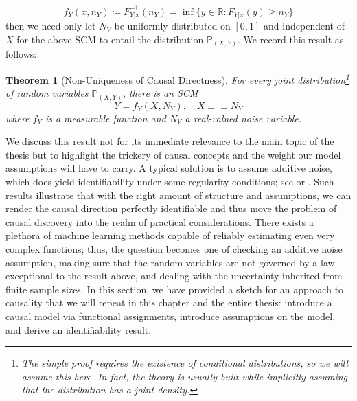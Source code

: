 \documentclass[11pt, a4paper]{memoir}
\theoremstyle{break}
\newtheorem{thm}{Theorem}
\theoremstyle{break}
\theoremstyle{nonumberplain}
\newcommand{\mR}{\mathbb{R}}
\newcommand{\mP}{\mathbb{P}}
\newcommand{\indep}{\perp \!\!\! \perp}
\begin{document}
$$f_Y(x,n_Y)\coloneqq F^{-1}_{Y|x}(n_Y)=\inf\{y\in \mR: F_{Y|x}(y)\geqslant n_Y\}$$
then we need only let $N_Y$ be uniformly distributed on $[0,1]$ and independent of $X$ for the above SCM to entail the distribution $\mP_{(X,Y)}$. We record this result as follows:
\begin{thm}[Non-Uniqueness of Causal Directness]
For every joint distribution\footnote{The simple proof requires the existence of conditional distributions, so we will assume this here. In fact, the theory is usually built while implicitly assuming that the distribution has a joint density.} of random variables $\mP_{(X,Y)}$, there is an SCM
$$Y=f_Y(X,N_Y),\quad X\indep N_Y$$
where $f_Y$ is a measurable function and $N_Y$ a real-valued noise variable.\\ \cite{Peters}
\end{thm}
We discuss this result not for its immediate relevance to the main topic of the thesis but to highlight the trickery of causal concepts and the weight our model assumptions will have to carry. A typical solution is to assume additive noise, which does yield identifiability under some regularity conditions; see \cite{ANM1} or \cite{ANM2}. Such results illustrate that with the right amount of structure and assumptions, we can render the causal direction perfectly identifiable and thus move the problem of causal discovery into the realm of practical considerations. There exists a plethora of machine learning methods capable of reliably estimating even very complex functions; thus, the question becomes one of checking an additive noise assumption, making sure that the random variables are not governed by a law exceptional to the result above, and dealing with the uncertainty inherited from finite sample sizes. In this section, we have provided a sketch for an approach to causality that we will repeat in this chapter and the entire thesis: introduce a causal model via functional assignments, introduce assumptions on the model, and derive an identifiability result.
\end{document}

